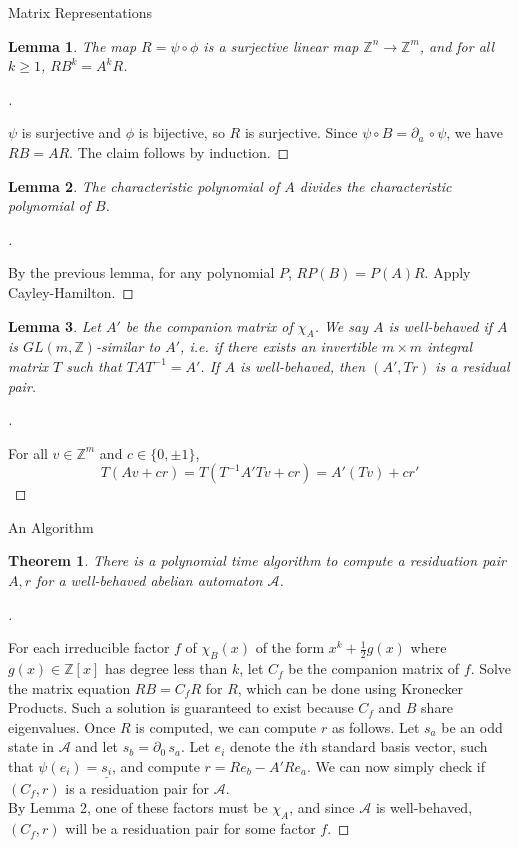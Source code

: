 \documentclass[a0]{a0poster}
\theoremstyle{pleasant}
\newtheorem{theorem}{Theorem}
\newtheorem{lemma}{Lemma}
\newcommand{\Z}{\mathbb Z}
\newcommand{\A}{\mathcal A}
\newcommand{\aut}[1]{\underline{#1}}
\renewcommand{\d}[1]{\partial_{#1}\,}
\newenvironment{myproof}[1][\proofname]{%
    \begin{proof}[#1]$ $\,
}{%
  \end{proof}
}
\begin{document}
\begin{multicols}{3}
\begin{poster-section}{Matrix Representations}
\begin{lemma}
    The map $R = \psi \circ \phi$ is a surjective linear map
    $\Z^n \rightarrow \Z^m$, and for all $k \ge 1$, $RB^k = A^kR$.
\end{lemma}
\begin{myproof}
    $\psi$ is surjective and $\phi$ is bijective, so $R$ is surjective.
    Since $\psi \circ B = \d{a} \circ \psi$, we have $RB = AR$.
    The claim follows by induction.
\end{myproof}

\begin{lemma}
    The characteristic polynomial of $A$ divides the characteristic
    polynomial of $B$.
\end{lemma}
\begin{myproof}
    By the previous lemma, for any polynomial $P$, $R P(B) = P(A) R$.
    Apply Cayley-Hamilton.
\end{myproof}

\begin{lemma}
    Let $A'$ be the companion matrix of $\chi_A$. We say $A$ is
    well-behaved if $A$ is $GL(m, \Z)$-similar to $A'$, i.e. if
    there exists an invertible $m \times m$ integral matrix $T$ such
    that $TAT^{-1} = A'$. If $A$ is well-behaved, then $(A', Tr)$
    is a residual pair.
\end{lemma}
\begin{myproof}
    For all $v \in \Z^m$ and $c \in \{0, \pm 1\}$,
    \[
        T(Av + cr) = T(T^{-1}A'Tv + cr) = A' (Tv) + c r'
    \]
\end{myproof}

\end{poster-section}

\begin{poster-section}{An Algorithm}
\Large
\begin{theorem}
    There is a polynomial time algorithm to compute a residuation pair
    $A, r$ for a well-behaved abelian automaton $\A$.
\end{theorem}
\begin{myproof}
    For each irreducible factor $f$ of $\chi_B(x)$ of the form
    $x^k + \frac{1}{2}g(x)$ where $g(x) \in \Z[x]$ has degree less
    than $k$, let $C_f$ be the companion matrix of $f$. Solve the matrix
    equation $RB = C_fR$ for $R$, which can be done using Kronecker
    Products. Such a solution is guaranteed to exist because $C_f$
    and $B$ share eigenvalues. Once $R$ is computed, we can compute $r$ as
    follows. Let $s_a$ be an odd state in $\A$ and let $s_b = \d{0} s_a$.
    Let $e_i$ denote the $i$th standard basis vector, such that
    $\psi(e_i) = \aut{s_i}$, and compute $r = Re_b - A'Re_a$.
    We can now simply check if $(C_f, r)$ is a residuation pair for $\A$.
    \\
    By Lemma 2, one of these factors must be $\chi_A$, and since $\A$ is
    well-behaved, $(C_f, r)$ will be a residuation pair for some factor $f$.
\end{myproof}


\end{poster-section}
\end{multicols}
\end{document}
